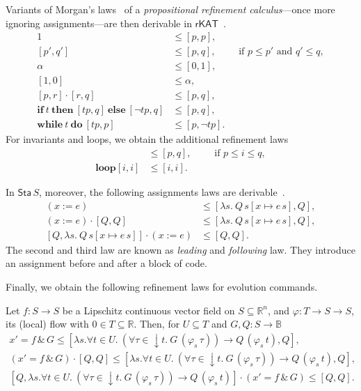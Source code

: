 \documentclass[envcountsame]{llncs}
\newcommand{\IF}[3]{\mathbf{if}\ #1\ \mathbf{then}\ #2\ \mathbf{else}\ #3}
\newcommand{\WHILE}[2]{\mathbf{while}\ #1\ \mathbf{do}\ #2}
\newcommand{\rKAT}{\mathsf{rKAT}}
\newcommand{\flow}{\varphi}
\newcommand{\reals}{\mathbb{R}}
\newcommand{\bools}{\mathbb{B}}
\newcommand{\sta}{\mathsf{Sta}}
\begin{document}
Variants of Morgan's laws~\cite{Morgan94} of a \emph{propositional
  refinement calculus}---once more ignoring assignments---are then derivable in
$\rKAT$~\cite{ArmstrongGS16}.
\begin{align}
  1 &\le [p,p],\label{eq:r-skip}\tag{r-skip}\\
[p',q'] &\le [p,q],\qquad \text{ if } p\le p'\text{ and } q'\le q,\label{eq:r-cons}\tag{r-cons}\\
\alpha & \le [0,1],\\
[1,0] &\le \alpha,\\
[p,r]\cdot [r,q] &\le [p,q],\label{eq:r-seq}\tag{r-seq}\\
\IF{t}{[tp,q]}{[\neg tp,q]} &\le [p,q],\label{eq:r-cond}\tag{r-cond}\\
 \WHILE{t}{[tp,p]} &\le [p,\neg tp]. \label{eq:r-while}\tag{r-while}
\end{align}
For invariants and loops, we obtain the additional refinement laws
\begin{align}
  [i,i] &\le [p,q],\qquad \text{ if } p\le i \le q,\label{eq:r-inv}\tag{r-inv}\\
\mathbf{loop} [i,i] &\le [i,i]. \label{eq:r-loop}\tag{r-loop}
\end{align}

In $\sta\, S$, moreover, the following assignments laws are
derivable~\cite{ArmstrongGS16}.
\begin{align}
 (x := e)  &\le  \left[\lambda s.\ Q\, s[x\mapsto e\, s],Q\right],\label{eq:r-assgn}\tag{r-assgn}\\
(x:= e) \cdot \left[Q,Q\right] &\le [\lambda s.\ Q\, s[x\mapsto e\, s],Q],\label{eq:r-assgn}\tag{r-assgnl}\\
\left[Q,\lambda s.\ Q\, s[x\mapsto e\, s]\right]\cdot (x:=e) &\le [Q,Q]. \label{eq:r-assgn}\tag{r-assgnf}
\end{align}
The second and third law are known as \emph{leading} and \emph{following}
law. They introduce an assignment before and after a block of code. 

Finally, we obtain the following refinement laws for evolution
commands.
\begin{lemma}\label{P:r-evl-lemma}
Let $f:S\to S$ be a Lipschitz continuous vector
field on $S\subseteq \reals^n$, and $\flow:T\to S\to S$, its (local) flow with $0\in T\subseteq \reals$. Then, for $U\subseteq T$ and $G,Q:S\to\bools$
\begin{gather*}
x' = f\, \&\, G \le [\lambda s.\forall t\in U.\ (\forall
\tau\in {\downarrow}t.\ G\, (\flow_s\, \tau))\to Q\, (\flow_s\, t),Q],\label{eq:r-evl}\tag{r-evl}\\
(x' = f\, \&\, G) \cdot \left[Q,Q\right] \le [\lambda s. \forall t\in U.\ (\forall
\tau\in {\downarrow}t.\ G\, (\flow_s\, \tau))\to Q\, (\flow_s\, t),Q],\label{eq:r-evll}\tag{r-evll}\\
\left[Q,\lambda s. \forall t\in U.\ (\forall
\tau\in {\downarrow}t.\ G\, (\flow_s\, \tau))\to Q\, (\flow_s\, t)\right]\cdot (x' = f\, \&\, G) \le [Q,Q].\label{eq:r-evlr}\tag{r-evlr}\\
\end{gather*}
\end{lemma}
\end{document}
